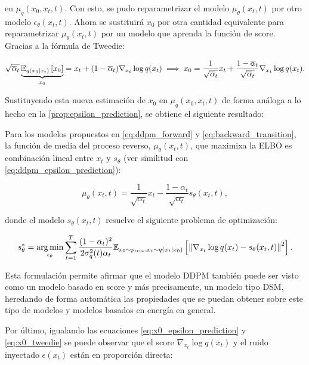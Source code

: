 en $\mu_q(x_0,x_t,t)$. Con esto, se pudo reparametrizar el modelo $\mu_\theta(x_t,t)$ por otro modelo $\epsilon_\theta(x_t,t)$. Ahora se sustituirá $x_0$ por otra cantidad equivalente para reparametrizar $\mu_\theta(x_t,t)$ por un modelo que aprenda la función de score. Gracias a la fórmula de Tweedie:

\begin{equation}
    \label{eq:x0_tweedie}
    \sqrt{\overline{\alpha}_t} \underbrace{\mathbb{E}_{q(x_0|x_t)}\left[x_0\right]}_{x_0} = x_t+(1-\overline{\alpha}_t)\nabla_{x_t}\log q(x_t) \implies x_0 = \frac{1}{\sqrt{\overline{\alpha}_t}} x_t + \frac{1-\overline{\alpha}_t}{\sqrt{\overline{\alpha}_t}}\nabla_{x_t} \log q(x_t).
\end{equation}

Sustituyendo esta nueva estimación de $x_0$ en $\mu_q(x_0,x_t,t)$ de forma análoga a lo hecho en la \autoref{prop:epsilon_prediction}, se obtiene el siguiente resultado:

\begin{prop}
    \label{prop:score_prediction}
    Para los modelos propuestos en \eqref{eq:ddpm_forward} y \eqref{eq:backward_transition}, la función de media del proceso reverso, $\mu_\theta(x_t,t)$, que maximixa la ELBO es combinación lineal entre $x_t$ y $s_\theta$ (ver similitud con \eqref{eq:ddpm_epsilon_prediction}):

    \begin{equation*}
        \mu_\theta(x_t,t) = \frac{1}{\sqrt{\alpha_t}}x_t - \frac{1-\alpha_t}{\sqrt{\alpha_t}}s_\theta(x_t,t) ,
    \end{equation*}

    donde el modelo $s_\theta(x_t,t)$ resuelve el siguiente problema de optimización:

    \begin{equation*}
        s_\theta^*=\operatorname*{arg\,min}_{\epsilon_\theta} \sum_{t=1}^T \frac{(1-\alpha_t)^2}{2\sigma_q^2(t)\alpha_t} \mathbb{E}_{x_0\sim p_{\operatorname{true}}, x_t\sim q(x_t|x_0)}\left[\left\lVert \nabla_{x_t}\log q(x_t) - s_\theta(x_t,t) \right\rVert^2\right] .
    \end{equation*}
\end{prop}

Esta formulación permite afirmar que el modelo DDPM también puede ser visto como un modelo basado en score y más precisamente, un modelo tipo DSM, heredando de forma automática las propiedades que se puedan obtener sobre este tipo de modelos y modelos basados en energía en general.

Por último, igualando las ecuaciones \eqref{eq:x0_epsilon_prediction} y \eqref{eq:x0_tweedie} se puede observar que el score $\nabla_{x_t}\log q(x_t)$ y el ruido inyectado $\epsilon(x_t)$ están en proporción directa:

